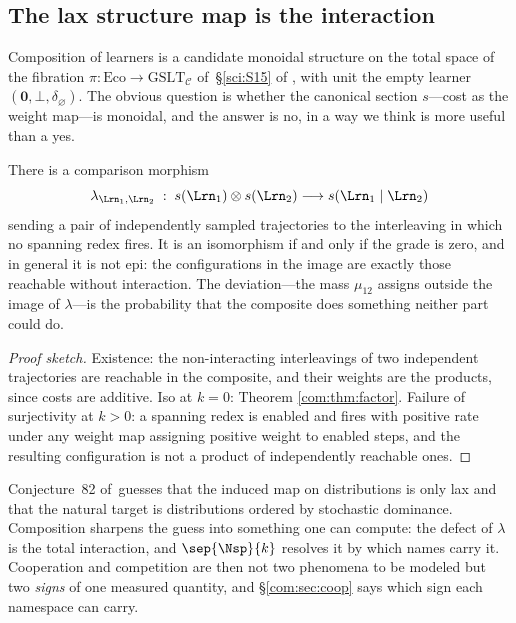 \subsection{The lax structure map is the interaction}\label{com:S4.3}

Composition of learners is a candidate monoidal structure on the total space of the fibration
$\pi : \mathrm{Eco} \to \mathrm{GSLT}_{\mathcal{C}}$ of~\S\ref{sci:S15} of \chSci, with unit the
empty learner $(\mathbf{0}, \bot, \delta_{\varnothing})$. The obvious question is whether the
canonical section $s$---cost as the weight map---is monoidal, and the answer is no, in a way we
think is more useful than a yes.

\begin{proposition}\label{com:prop:lax}
There is a comparison morphism
\[
  \lambda_{\Lrn_1,\Lrn_2} \;:\; s(\Lrn_1) \otimes s(\Lrn_2) \longrightarrow s(\Lrn_1 \mid \Lrn_2)
\]
sending a pair of independently sampled trajectories to the interleaving in which no spanning
redex fires. It is an isomorphism if and only if the grade is zero, and in general it is not
epi: the configurations in the image are exactly those reachable without interaction. The
deviation---the mass $\mu_{12}$ assigns outside the image of $\lambda$---is the probability that
the composite does something neither part could do.
\end{proposition}

\begin{proof}[Proof sketch]
Existence: the non-interacting interleavings of two independent trajectories are reachable in the
composite, and their weights are the products, since costs are additive. Iso at $k=0$: Theorem
\ref{com:thm:factor}. Failure of surjectivity at $k>0$: a spanning redex is enabled and fires with
positive rate under any weight map assigning positive weight to enabled steps, and the resulting
configuration is not a product of independently reachable ones.
\end{proof}

\begin{remark}\label{com:good-news-that-laxity}
Conjecture~82 of~\chSci guesses that the induced map on distributions is only lax and
that the natural target is distributions ordered by stochastic dominance. Composition sharpens
the guess into something one can compute: the defect of $\lambda$ is the total interaction, and
$\sep{\Nsp}{k}$ resolves it by which names carry it. Cooperation and competition are then not two
phenomena to be modeled but two \emph{signs} of one measured quantity, and \S\ref{com:sec:coop} says
which sign each namespace can carry.
\end{remark}

